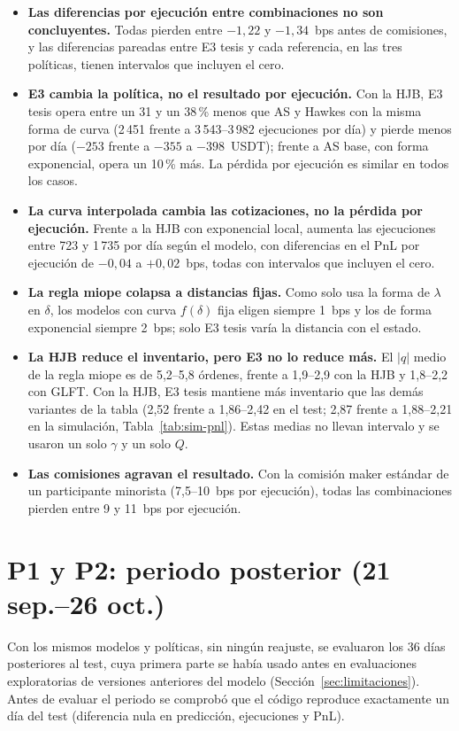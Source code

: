 \begin{itemize}[nosep]
\item \textbf{Las diferencias por ejecución entre combinaciones no son concluyentes.} Todas pierden entre $-1{,}22$ y $-1{,}34$~bps antes de comisiones, y las diferencias pareadas entre E3 tesis y cada referencia, en las tres políticas, tienen intervalos que incluyen el cero.
\item \textbf{E3 cambia la política, no el resultado por ejecución.} Con la HJB, E3 tesis opera entre un 31 y un 38\,\% menos que AS y Hawkes con la misma forma de curva (2\,451 frente a 3\,543--3\,982 ejecuciones por día) y pierde menos por día ($-253$ frente a $-355$ a $-398$~USDT); frente a AS base, con forma exponencial, opera un 10\,\% más. La pérdida por ejecución es similar en todos los casos.
\item \textbf{La curva interpolada cambia las cotizaciones, no la pérdida por ejecución.} Frente a la HJB con exponencial local, aumenta las ejecuciones entre 723 y 1\,735 por día según el modelo, con diferencias en el PnL por ejecución de $-0{,}04$ a $+0{,}02$~bps, todas con intervalos que incluyen el cero.
\item \textbf{La regla miope colapsa a distancias fijas.} Como solo usa la forma de $\lambda$ en $\delta$, los modelos con curva $f(\delta)$ fija eligen siempre 1~bps y los de forma exponencial siempre 2~bps; solo E3 tesis varía la distancia con el estado.
\item \textbf{La HJB reduce el inventario, pero E3 no lo reduce más.} El $|q|$ medio de la regla miope es de 5,2--5,8 órdenes, frente a 1,9--2,9 con la HJB y 1,8--2,2 con GLFT. Con la HJB, E3 tesis mantiene más inventario que las demás variantes de la tabla (2,52 frente a 1,86--2,42 en el test; 2,87 frente a 1,88--2,21 en la simulación, Tabla~\ref{tab:sim-pnl}). Estas medias no llevan intervalo y se usaron un solo $\gamma$ y un solo $Q$.
\item \textbf{Las comisiones agravan el resultado.} Con la comisión maker estándar de un participante minorista (7,5--10~bps por ejecución), todas las combinaciones pierden entre 9 y 11~bps por ejecución.
\end{itemize}

\section{P1 y P2: periodo posterior (21 sep.--26 oct.)}
\label{sec:simulacion}

Con los mismos modelos y políticas, sin ningún reajuste, se evaluaron los 36 días posteriores al test, cuya primera parte se había usado antes en evaluaciones exploratorias de versiones anteriores del modelo (Sección~\ref{sec:limitaciones}). Antes de evaluar el periodo se comprobó que el código reproduce exactamente un día del test (diferencia nula en predicción, ejecuciones y PnL).

